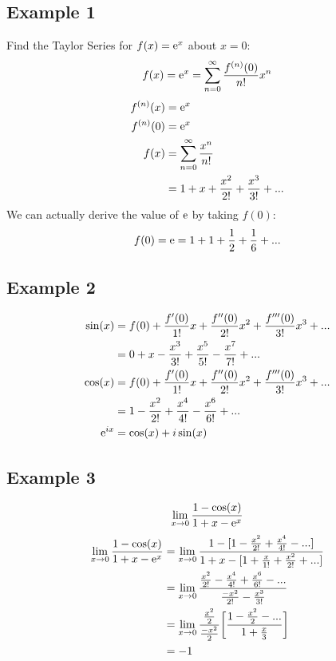 \documentclass[letterpaper, 12pt]{math}
\begin{document}
\subsection*{Example 1}
Find the Taylor Series for \( f(x)= \mathrm{e}^{x} \) about \( x = 0 \):
\[ f(x) = \mathrm{e}^{x} = \sum_{n=0}^{\infty}\frac{f^{(n)}(0)}{n!}x^{n} \]
\begin{align*}
  f^{(n)}(x) &= \mathrm{e}^{x} \\
  f^{(n)}(0) &= \mathrm{e}^{x} \\
  f(x) &= \sum_{n=0}^{\infty}\frac{x^{n}}{n!} \\
  &= 1+x+\frac{x^{2}}{2!}+\frac{x^{3}}{3!}+...
\end{align*}
We can actually derive the value of \( \mathrm{e} \) by taking \( f(0) \):
\[ f(0) = \mathrm{e} = 1+1+\frac{1}{2}+\frac{1}{6}+... \]

\subsection*{Example 2}
\begin{align*}
  \sin(x) &= f(0)+\frac{f'(0)}{1!}x+\frac{f''(0)}{2!}x^{2}+
    \frac{f'''(0)}{3!}x^{3}+... \\
  &= 0+x-\frac{x^{3}}{3!}+\frac{x^{5}}{5!}-\frac{x^{7}}{7!}+... \\
  \cos(x) &= f(0)+\frac{f'(0)}{1!}x+\frac{f''(0)}{2!}x^{2}+
    \frac{f'''(0)}{3!}x^{3}+... \\
  &= 1-\frac{x^{2}}{2!}+\frac{x^{4}}{4!}-\frac{x^{6}}{6!}+... \\
  \mathrm{e}^{ix} &= \cos(x)+i\sin(x)
\end{align*}

\subsection*{Example 3}
\[ \lim_{x\to0}\frac{1-\cos(x)}{1+x-\mathrm{e}^{x}} \]
\begin{align*}
  \lim_{x\to0}\frac{1-\cos(x)}{1+x-\mathrm{e}^{x}} &=
    \lim_{x\to0}\frac{1-[1-\frac{x^{2}}{2!}+\frac{x^{4}}{4!}-...]}
      {1+x-[1+\frac{x}{1!}+\frac{x^{2}}{2!}+...]} \\
  &= \lim_{x\to0}\frac{\frac{x^{2}}{2!}-\frac{x^{4}}{4!}+\frac{x^{6}}{6!}-...}
    {\frac{-x^{2}}{2!}-\frac{x^{3}}{3!}} \\
  &= \lim_{x\to0}\frac{\frac{x^{2}}{2}}{\frac{-x^{2}}{2}}
    \bigg[\frac{1-\frac{x^{2}}{2}-...}{1+\frac{x}{3}}\bigg] \\
  &= -1
\end{align*}
\end{document}
